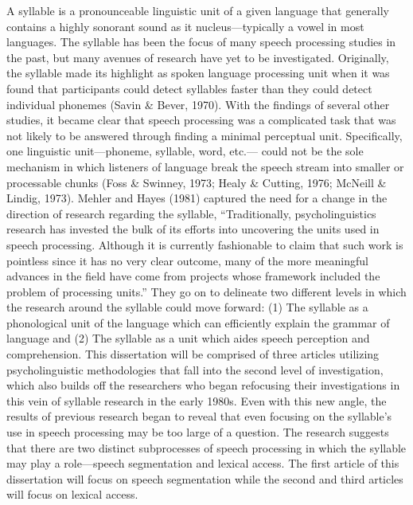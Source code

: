 A syllable is a pronounceable linguistic unit of a given language that generally contains a highly sonorant sound as it nucleus—typically a vowel in most languages. The syllable has been the focus of many speech processing studies in the past, but many avenues of research have yet to be investigated. Originally, the syllable made its highlight as spoken language processing unit when it was found that participants could detect syllables faster than they could detect individual phonemes (Savin \& Bever, 1970). With the findings of several other studies, it became clear that speech processing was a complicated task that was not likely to be answered through finding a minimal perceptual unit. Specifically, one linguistic unit—phoneme, syllable, word, etc.— could not be the sole mechanism in which listeners of language break the speech stream into smaller or processable chunks (Foss \& Swinney, 1973; Healy \& Cutting, 1976; McNeill \& Lindig, 1973). Mehler and Hayes (1981) captured the need for a change in the direction of research regarding the syllable, “Traditionally, psycholinguistics research has invested the bulk of its efforts into uncovering the units used in speech processing. Although it is currently fashionable to claim that such work is pointless since it has no very clear outcome, many of the more meaningful advances in the field have come from projects whose framework included the problem of processing units.” They go on to delineate two different levels in which the research around the syllable could move forward: (1) The syllable as a phonological unit of the language which can efficiently explain the grammar of language and (2) The syllable as a unit which aides speech perception and comprehension. This dissertation will be comprised of three articles utilizing psycholinguistic methodologies that fall into the second level of investigation, which also builds off the researchers who began refocusing their investigations in this vein of syllable research in the early 1980s. Even with this new angle, the results of previous research began to reveal that even focusing on the syllable’s use in speech processing may be too large of a question. The research suggests that there are two distinct subprocesses of speech processing in which the syllable may play a role—speech segmentation and lexical access. The first article of this dissertation will focus on speech segmentation while the second and third articles will focus on lexical access.


